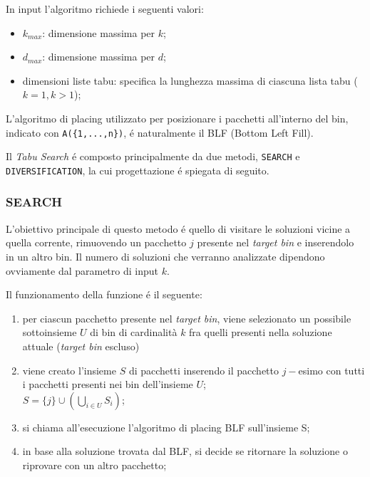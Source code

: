 In input l'algoritmo richiede i seguenti valori:
\begin{itemize}[noitemsep]
\item $k_{max}$: dimensione massima per $k$;
\item $d_{max}$: dimensione massima per $d$;
\item dimensioni liste tabu: specifica la lunghezza massima di ciascuna lista tabu ($k=1, k>1$);
\end{itemize}

L'algoritmo di placing utilizzato per posizionare i pacchetti all'interno del bin, indicato con \texttt{A(\{1,...,n\})}, é naturalmente il BLF (Bottom Left Fill).

Il \textit{Tabu Search} é composto principalmente da due metodi, \texttt{SEARCH} e \texttt{DIVERSIFICATION}, la cui progettazione é spiegata di seguito.

\subsubsection{SEARCH}
L'obiettivo principale di questo metodo é quello di visitare le soluzioni vicine a quella corrente, rimuovendo un pacchetto $j$ presente nel \textit{target bin} e inserendolo in un altro bin. Il numero di soluzioni che verranno analizzate dipendono ovviamente dal parametro di input $k$.

Il funzionamento della funzione é il seguente:
\begin{enumerate}[noitemsep]
   \item per ciascun pacchetto presente nel \textit{target bin}, viene selezionato un possibile sottoinsieme $U$ di bin di cardinalità $k$ fra quelli presenti nella soluzione attuale (\textit{target bin} escluso)
   \item viene creato l'insieme $S$ di pacchetti inserendo il pacchetto $j-$esimo con tutti i pacchetti presenti nei bin dell'insieme $U$;\\$S = \{j\} \cup (\bigcup_{i\in U}S_i)$;
   \item si chiama all'esecuzione l'algoritmo di placing BLF sull'insieme S;
   \item in base alla soluzione trovata dal BLF, si decide se ritornare la soluzione o riprovare con un altro pacchetto;
\end{enumerate}

